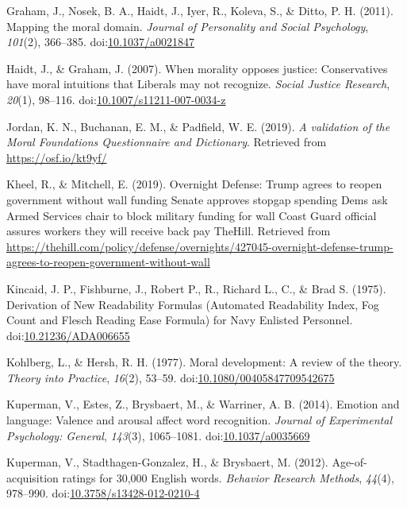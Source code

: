 \documentclass[english,,man]{apa6}
\begin{document}
\leavevmode\hypertarget{ref-Graham2011}{}%
Graham, J., Nosek, B. A., Haidt, J., Iyer, R., Koleva, S., \& Ditto, P. H. (2011). Mapping the moral domain. \emph{Journal of Personality and Social Psychology}, \emph{101}(2), 366--385. doi:\href{https://doi.org/10.1037/a0021847}{10.1037/a0021847}

\leavevmode\hypertarget{ref-Haidt2007}{}%
Haidt, J., \& Graham, J. (2007). When morality opposes justice: Conservatives have moral intuitions that Liberals may not recognize. \emph{Social Justice Research}, \emph{20}(1), 98--116. doi:\href{https://doi.org/10.1007/s11211-007-0034-z}{10.1007/s11211-007-0034-z}

\leavevmode\hypertarget{ref-Jordan2019}{}%
Jordan, K. N., Buchanan, E. M., \& Padfield, W. E. (2019). \emph{A validation of the Moral Foundations Questionnaire and Dictionary}. Retrieved from \url{https://osf.io/kt9yf/}

\leavevmode\hypertarget{ref-Kheel2019}{}%
Kheel, R., \& Mitchell, E. (2019). Overnight Defense: Trump agrees to reopen government without wall funding \textbar{} Senate approves stopgap spending \textbar{} Dems ask Armed Services chair to block military funding for wall \textbar{} Coast Guard official assures workers they will receive back pay \textbar{} TheHill. Retrieved from \url{https://thehill.com/policy/defense/overnights/427045-overnight-defense-trump-agrees-to-reopen-government-without-wall}

\leavevmode\hypertarget{ref-Kincaid1975}{}%
Kincaid, J. P., Fishburne, J., Robert P., R., Richard L., C., \& Brad S. (1975). Derivation of New Readability Formulas (Automated Readability Index, Fog Count and Flesch Reading Ease Formula) for Navy Enlisted Personnel. doi:\href{https://doi.org/10.21236/ADA006655}{10.21236/ADA006655}

\leavevmode\hypertarget{ref-Kohlberg1977}{}%
Kohlberg, L., \& Hersh, R. H. (1977). Moral development: A review of the theory. \emph{Theory into Practice}, \emph{16}(2), 53--59. doi:\href{https://doi.org/10.1080/00405847709542675}{10.1080/00405847709542675}

\leavevmode\hypertarget{ref-Kuperman2014}{}%
Kuperman, V., Estes, Z., Brysbaert, M., \& Warriner, A. B. (2014). Emotion and language: Valence and arousal affect word recognition. \emph{Journal of Experimental Psychology: General}, \emph{143}(3), 1065--1081. doi:\href{https://doi.org/10.1037/a0035669}{10.1037/a0035669}

\leavevmode\hypertarget{ref-Kuperman2012}{}%
Kuperman, V., Stadthagen-Gonzalez, H., \& Brysbaert, M. (2012). Age-of-acquisition ratings for 30,000 English words. \emph{Behavior Research Methods}, \emph{44}(4), 978--990. doi:\href{https://doi.org/10.3758/s13428-012-0210-4}{10.3758/s13428-012-0210-4}
\end{document}
